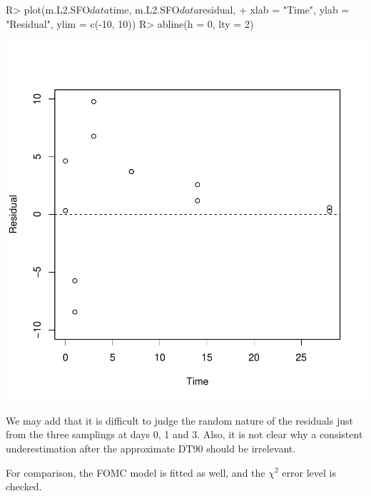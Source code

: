 \documentclass[12pt,a4paper]{article}
\begin{document}
\begin{Schunk}
\begin{Sinput}
R> plot(m.L2.SFO$data$time, m.L2.SFO$data$residual,
+   xlab = "Time", ylab = "Residual", ylim = c(-10, 10))
R> abline(h = 0, lty = 2)
\end{Sinput}
\end{Schunk}
\includegraphics{examples-L2_SFO_residuals}

We may add that it is difficult to judge the random nature of the residuals just 
from the three samplings at days 0, 1 and 3. Also, it is not clear why a
consistent underestimation after the approximate DT90 should be irrelevant.

For comparison, the FOMC model is fitted as well, and the $\chi^2$ error level
is checked.
\end{document}

